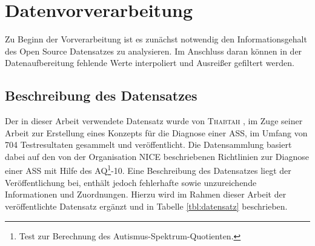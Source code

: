 \section{Datenvorverarbeitung}
Zu Beginn der Vorverarbeitung ist es zunächst notwendig den Informationsgehalt des Open Source Datensatzes zu analysieren. Im Anschluss daran können in der Datenaufbereitung fehlende Werte interpoliert und Ausreißer gefiltert werden.

\subsection{Beschreibung des Datensatzes}
Der in dieser Arbeit verwendete Datensatz wurde von \textsc{Thabtah} \cite{Thabtah2017, Thabtah}, im Zuge seiner Arbeit zur Erstellung eines Konzepts für die Diagnose einer ASS, im Umfang von 704 Testresultaten gesammelt und veröffentlicht. Die Datensammlung basiert dabei auf den von der Organisation \textsc{NICE} \cite{NICE2012} beschriebenen Richtlinien zur Diagnose einer ASS mit Hilfe des AQ\footnote{\label{foot:3}Test zur Berechnung des Autismus-Spektrum-Quotienten.}-10. Eine Beschreibung des Datensatzes liegt der Veröffentlichung bei, enthält jedoch fehlerhafte sowie unzureichende Informationen und Zuordnungen. Hierzu wird im Rahmen dieser Arbeit der veröffentlichte Datensatz ergänzt und in Tabelle \ref{tbl:datensatz} beschrieben.

